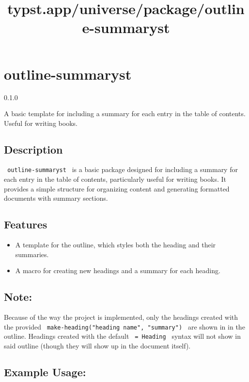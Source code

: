 \title{typst.app/universe/package/outline-summaryst}

\label{banner}
\section{outline-summaryst}\label{outline-summaryst}

{ 0.1.0 }

A basic template for including a summary for each entry in the table of
contents. Useful for writing books.

\label{readme}
\subsection{Description}\label{description}

\texttt{\ outline-summaryst\ } is a basic package designed for including
a summary for each entry in the table of contents, particularly useful
for writing books. It provides a simple structure for organizing content
and generating formatted documents with summary sections.

\subsection{Features}\label{features}

\begin{itemize}
\tightlist
\item
  A template for the outline, which styles both the heading and their
  summaries.
\item
  A macro for creating new headings and a summary for each heading.
\end{itemize}

\subsection{Note:}\label{note}

Because of the way the project is implemented, only the headings created
with the provided \texttt{\ make-heading("heading\ name",\ "summary")\ }
are shown in in the outline. Headings created with the default
\texttt{\ =\ Heading\ } syntax will not show in said outline (though
they will show up in the document itself).

\subsection{Example Usage:}\label{example-usage}

